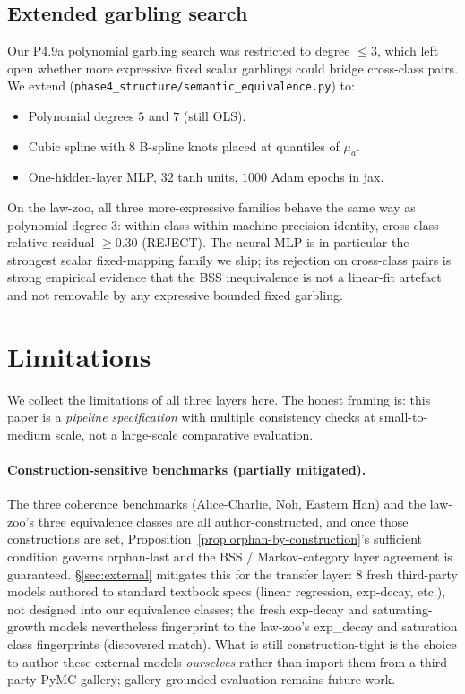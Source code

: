 \documentclass{article}
\begin{document}
\subsection{Extended garbling search}
\label{sec:garbling}

Our P4.9a polynomial garbling search was restricted to degree
$\leq 3$, which left open whether more expressive fixed scalar
garblings could bridge cross-class pairs. We extend
(\texttt{phase4\_structure/semantic\_equivalence.py}) to:
\begin{itemize}[leftmargin=*, itemsep=0pt]
\item Polynomial degrees $5$ and $7$ (still OLS).
\item Cubic spline with $8$ B-spline knots placed at quantiles of
  $\mu_{a}$.
\item One-hidden-layer MLP, $32$ tanh units, $1000$ Adam epochs in
  jax.
\end{itemize}
On the law-zoo, all three more-expressive families behave the same
way as polynomial degree-$3$: within-class within-machine-precision
identity, cross-class relative residual $\geq 0.30$ (REJECT). The
neural MLP is in particular the strongest scalar fixed-mapping
family we ship; its rejection on cross-class pairs is strong
empirical evidence that the BSS inequivalence is not a
linear-fit artefact and not removable by any expressive bounded
fixed garbling.

\section{Limitations}
\label{sec:limitations}

We collect the limitations of all three layers here. The honest
framing is: this paper is a \emph{pipeline specification} with
multiple consistency checks at small-to-medium scale, not a
large-scale comparative evaluation.

\paragraph{Construction-sensitive benchmarks (partially mitigated).}
The three coherence benchmarks (Alice-Charlie, Noh, Eastern Han) and
the law-zoo's three equivalence classes are all author-constructed,
and once those constructions are set,
Proposition~\ref{prop:orphan-by-construction}'s sufficient condition
governs orphan-last and the BSS / Markov-category layer agreement is
guaranteed. \S\ref{sec:external} mitigates this for the transfer
layer: $8$ fresh third-party models authored to standard textbook
specs (linear regression, exp-decay, etc.), not designed into our
equivalence classes; the fresh exp-decay and saturating-growth
models nevertheless fingerprint to the law-zoo's exp\_decay and
saturation class fingerprints (discovered match). What is still
construction-tight is the choice to author these external models
\emph{ourselves} rather than import them from a third-party PyMC
gallery; gallery-grounded evaluation remains future work.
\end{document}
